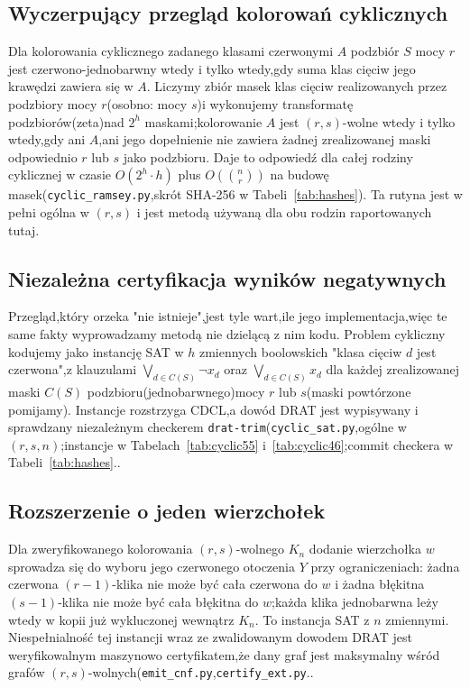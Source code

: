 \documentclass[11pt]{article}
\theoremstyle{definition}
\theoremstyle{plain}
\newcommand{\K}{\ensuremath{K}}
\begin{document}
\subsection{Wyczerpujący przegląd kolorowań cyklicznych}\label{sec:enumerate}
Dla kolorowania cyklicznego zadanego klasami czerwonymi $A$ podzbiór $S$ mocy $r$ jest czerwono-jednobarwny wtedy i tylko wtedy,gdy suma klas cięciw jego krawędzi zawiera się w $A$. Liczymy zbiór masek klas cięciw realizowanych przez podzbiory mocy $r$(osobno: mocy $s$)i wykonujemy transformatę podzbiorów(zeta)nad $2^h$ maskami;kolorowanie $A$ jest $(r,s)$-wolne wtedy i tylko wtedy,gdy ani $A$,ani jego dopełnienie nie zawiera żadnej zrealizowanej maski odpowiednio $r$ lub $s$ jako podzbioru. Daje to odpowiedź dla całej rodziny cyklicznej w czasie $O(2^h \cdot h)$ plus $O(\binom{n}{r})$ na budowę masek(\texttt{cyclic\_ramsey.py},skrót SHA-256 w Tabeli~\ref{tab:hashes}). Ta rutyna jest w pełni ogólna w $(r,s)$ i jest metodą używaną dla obu rodzin raportowanych tutaj.



\subsection{Niezależna certyfikacja wyników negatywnych}\label{sec:cdcl}
Przegląd,który orzeka "nie istnieje",jest tyle wart,ile jego implementacja,więc te same fakty wyprowadzamy metodą nie dzielącą z nim kodu. Problem cykliczny kodujemy jako instancję SAT w $h$ zmiennych boolowskich "klasa cięciw $d$ jest czerwona",z klauzulami $\bigvee_{d \in C(S)} \neg x_d$ oraz $\bigvee_{d \in C(S)} x_d$ dla każdej zrealizowanej maski $C(S)$ podzbioru(jednobarwnego)mocy $r$ lub $s$(maski powtórzone pomijamy). Instancje rozstrzyga CDCL,a dowód DRAT jest wypisywany i sprawdzany niezależnym checkerem \texttt{drat-trim}(\texttt{cyclic\_sat.py},ogólne w $(r,s,n)$;instancje w Tabelach~\ref{tab:cyclic55} i~\ref{tab:cyclic46};commit checkera w Tabeli~\ref{tab:hashes}..

\subsection{Rozszerzenie o jeden wierzchołek}\label{sec:ext}
Dla zweryfikowanego kolorowania $(r,s)$-wolnego $\K_n$ dodanie wierzchołka $w$ sprowadza się do wyboru jego czerwonego otoczenia $Y$ przy ograniczeniach: żadna czerwona $(r-1)$-klika nie może być cała czerwona do $w$ i żadna błękitna $(s-1)$-klika nie może być cała błękitna do $w$;każda klika jednobarwna leży wtedy w kopii już wykluczonej wewnątrz $\K_n$. To instancja SAT z $n$ zmiennymi. Niespełnialność tej instancji wraz ze zwalidowanym dowodem DRAT jest weryfikowalnym maszynowo certyfikatem,że dany graf jest maksymalny wśród grafów $(r,s)$-wolnych(\texttt{emit\_cnf.py},\texttt{certify\_ext.py}..
\end{document}
